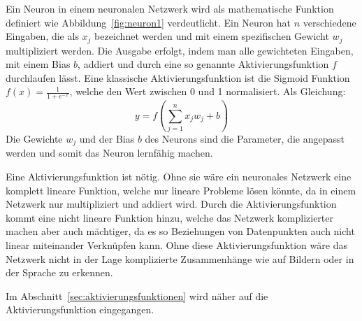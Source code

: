 \documentclass[12pt,a4paper]{report}
\begin{document}
Ein Neuron in einem neuronalen Netzwerk wird als mathematische Funktion definiert wie Abbildung~\ref{fig:neuron1}
verdeutlicht.
Ein Neuron hat $n$ verschiedene Eingaben, die als $x_j$ bezeichnet werden und mit einem spezifischen Gewicht $w_j$ multipliziert werden.
Die Ausgabe erfolgt, indem man alle gewichteten Eingaben, mit einem Bias $b$, addiert und durch eine so genannte
Aktivierungsfunktion $f$ durchlaufen lässt.
Eine klassische Aktivierungsfunktion ist die Sigmoid Funktion $f(x) = \frac{1}{1 + e^{-x}}$, welche den Wert zwischen 0 und 1 normalisiert.
Als Gleichung:
\[y =f\left(\sum_{j=1}^{n} x_j w_j + b\right)\]
Die Gewichte $w_j$ und der Bias $b$ des Neurons sind die Parameter, die angepasst werden und somit das Neuron lernfähig machen.

Eine Aktivierungsfunktion ist nötig.
Ohne sie wäre ein neuronales Netzwerk eine komplett lineare Funktion,
welche nur lineare Probleme lösen könnte\cite{activations}, da in einem Netzwerk nur multipliziert und addiert wird.
Durch die Aktivierungsfunktion kommt eine nicht lineare Funktion hinzu, welche das Netzwerk komplizierter machen
aber auch mächtiger, da es so Beziehungen von Datenpunkten auch nicht linear miteinander Verknüpfen kann.
Ohne diese Aktivierungsfunktion wäre das Netzwerk nicht in der Lage komplizierte Zusammenhänge wie auf Bildern oder in der Sprache zu erkennen\cite{activations}.

Im Abschnitt~\ref{sec:aktivierungsfunktionen} wird näher auf die Aktivierungsfunktion eingegangen.
\end{document}
